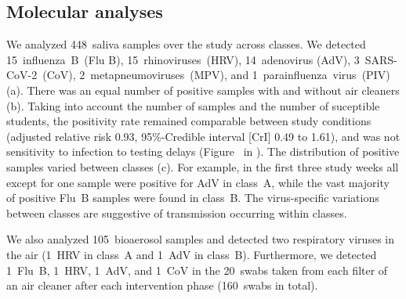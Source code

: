 \documentclass[fleqn,11pt]{wlscirep}
\begin{document}
\subsection{Molecular analyses}

We analyzed 448~saliva samples over the study across classes. We detected 15~influenza~B~(Flu B), 15~rhinoviruses~(HRV), 14~adenovirus (AdV), 3~SARS-CoV-2~(CoV), 2~metapneumoviruses~(MPV), and 1~parainfluenza~virus~(PIV) (a). There was an equal number of positive samples with and without air cleaners (b). Taking into account the number of samples and the number of suceptible students, the positivity rate remained comparable between study conditions (adjusted relative risk 0.93, 95\%-Credible interval [CrI] 0.49 to 1.61), and was not sensitivity to infection to testing delays (Figure~ in \supp). The distribution of positive samples varied between classes (c). For example, in the first three study weeks all except for one sample were positive for AdV in class~A, while the vast majority of positive Flu~B samples were found in class~B. The virus-specific variations between classes are suggestive of transmission occurring within classes.

We also analyzed 105~bioaerosol samples and detected  two respiratory viruses in the air (1~HRV in class~A and 1~AdV in class~B). Furthermore, we detected 1~Flu~B, 1~HRV, 1~AdV, and 1~CoV in the 20~swabs taken from each filter of an air cleaner after each intervention phase (160~swabs in total).
\end{document}
